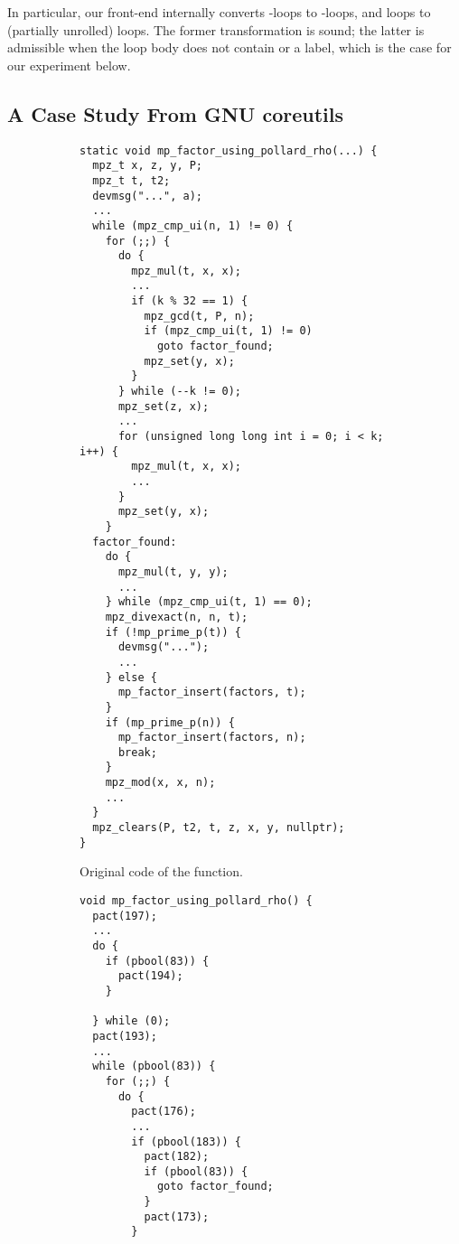 \begin{remark}
In particular, our front-end internally converts -loops to -loops, and  loops to (partially unrolled)  loops. The former transformation is sound; the latter is admissible when the loop body does not contain  or a label, which is the case for our experiment below.
\end{remark}

\subsection{A Case Study From GNU coreutils}

\begin{figure}[hbtp]
\centering
 \begin{subfigure}{0.46\textwidth}
 \begin{lstlisting}[basicstyle=\tiny\ttfamily]
  static void mp_factor_using_pollard_rho(...) {
  mpz_t x, z, y, P;
  mpz_t t, t2;
  devmsg("...", a);
  ...
  while (mpz_cmp_ui(n, 1) != 0) {
    for (;;) {
      do {
        mpz_mul(t, x, x);
        ...
        if (k % 32 == 1) {
          mpz_gcd(t, P, n);
          if (mpz_cmp_ui(t, 1) != 0)
            goto factor_found;
          mpz_set(y, x);
        }
      } while (--k != 0);
      mpz_set(z, x);
      ...
      for (unsigned long long int i = 0; i < k; i++) {
        mpz_mul(t, x, x);
        ...
      }
      mpz_set(y, x);
    }
  factor_found:
    do {
      mpz_mul(t, y, y);
      ...
    } while (mpz_cmp_ui(t, 1) == 0);
    mpz_divexact(n, n, t);
    if (!mp_prime_p(t)) {
      devmsg("...");
      ...
    } else {
      mp_factor_insert(factors, t);
    }
    if (mp_prime_p(n)) {
      mp_factor_insert(factors, n);
      break;
    }
    mpz_mod(x, x, n);
    ...
  }
  mpz_clears(P, t2, t, z, x, y, nullptr);
}
 \end{lstlisting}
 \caption{\label{c:orig}Original code of the function.}
 \end{subfigure}
 \begin{subfigure}{0.46\textwidth}
 \begin{lstlisting}[basicstyle=\tiny\ttfamily]
void mp_factor_using_pollard_rho() {
  pact(197);
  ...
  do {
    if (pbool(83)) {
      pact(194);
    }

  } while (0);
  pact(193);
  ...
  while (pbool(83)) {
    for (;;) {
      do {
        pact(176);
        ...
        if (pbool(183)) {
          pact(182);
          if (pbool(83)) {
            goto factor_found;
          }
          pact(173);
        }


\end{lstlisting}
\end{subfigure}
\end{figure}
